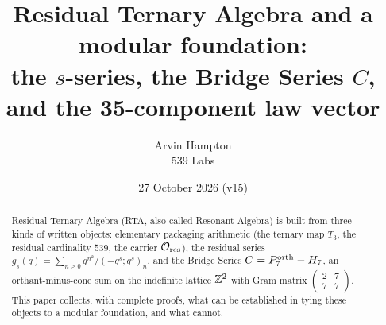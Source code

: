 \title{Residual Ternary Algebra and a modular foundation:\\ the $s$-series, the Bridge Series $C$, and the 35-component law vector}
\author{Arvin Hampton\\ \small 539 Labs}
\date{27 October 2026 (v15)}

\maketitle
\begin{abstract}
Residual Ternary Algebra (RTA, also called Resonant Algebra) is built from three kinds of written objects: elementary packaging arithmetic
(the ternary map $T_3$, the residual cardinality $539$, the carrier $\mathcal O_{\rm res}$), the residual series
$g_s(q)=\sum_{n\ge0}q^{n^2}/(-q^s;q^s)_n$, and the Bridge Series $C=P^{\mathrm{orth}}_7-H_7$, an orthant-minus-cone sum on the indefinite lattice
$\mathbb{Z}^2$ with Gram matrix $\left(\begin{smallmatrix}2&7\\7&7\end{smallmatrix}\right)$. This paper collects, with complete proofs, what can be
established in tying these objects to a modular foundation, and what cannot.


\end{abstract}
